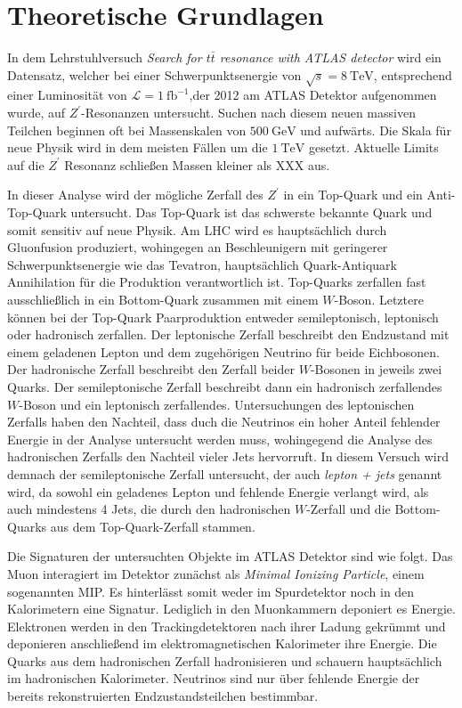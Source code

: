 \section{Theoretische Grundlagen}

In dem Lehrstuhlversuch \textit{Search for $t\bar{t}$ resonance with ATLAS detector} wird ein Datensatz, welcher bei 
einer Schwerpunktsenergie von $\sqrt{s} = \SI{8}{\tera\electronvolt}$, entsprechend einer Luminosität von 
$\mathcal{L} = \SI{1}{\femto\barn}^{-1}$,der 2012 am ATLAS Detektor aufgenommen wurde, auf $Z^\prime$-Resonanzen untersucht. 
Suchen nach diesem neuen massiven Teilchen beginnen oft bei Massenskalen von $\SI{500}{\giga\electronvolt}$ und aufwärts. Die 
Skala für neue Physik wird in dem meisten Fällen um die $\SI{1}{\tera\electronvolt}$ gesetzt. Aktuelle Limits auf die 
$Z^\prime$ Resonanz schließen Massen kleiner als XXX aus. \par 

In dieser Analyse wird der mögliche Zerfall des $Z^\prime$ in ein Top-Quark und ein Anti-Top-Quark untersucht. Das Top-Quark 
ist das schwerste bekannte Quark und somit sensitiv auf neue Physik. Am LHC wird es hauptsächlich durch Gluonfusion 
produziert, wohingegen an Beschleunigern mit geringerer Schwerpunktsenergie wie das Tevatron, hauptsächlich Quark-Antiquark 
Annihilation für die Produktion verantwortlich ist. Top-Quarks 
zerfallen fast ausschließlich in ein Bottom-Quark zusammen mit einem $W$-Boson. Letztere können bei der 
Top-Quark Paarproduktion entweder semileptonisch, 
leptonisch oder hadronisch zerfallen. Der leptonische Zerfall beschreibt den Endzustand mit einem geladenen Lepton und 
dem zugehörigen Neutrino für beide Eichbosonen. Der hadronische Zerfall beschreibt den Zerfall beider $W$-Bosonen in 
jeweils zwei Quarks. Der semileptonische Zerfall beschreibt dann ein hadronisch zerfallendes $W$-Boson und ein leptonisch 
zerfallendes. Untersuchungen des leptonischen Zerfalls haben den Nachteil, dass duch die Neutrinos ein hoher Anteil fehlender 
Energie in der Analyse untersucht werden muss, wohingegend die Analyse des hadronischen Zerfalls den Nachteil vieler Jets 
hervorruft. In diesem Versuch wird demnach der semileptonische Zerfall untersucht, der auch \textit{lepton + jets} genannt wird, 
da sowohl ein geladenes Lepton und fehlende Energie verlangt wird, als auch mindestens 4 Jets, die durch den hadronischen $W$-Zerfall und die Bottom-Quarks 
aus dem Top-Quark-Zerfall stammen. \par 

Die Signaturen der untersuchten Objekte im ATLAS Detektor sind wie folgt. Das Muon interagiert im Detektor zunächst als \textit{Minimal Ionizing Particle}, 
einem sogenannten MIP. Es hinterlässt somit weder im Spurdetektor noch in den Kalorimetern eine Signatur. Lediglich in den Muonkammern deponiert es 
Energie. Elektronen werden in den Trackingdetektoren nach ihrer Ladung gekrümmt und deponieren anschließend im elektromagnetischen Kalorimeter ihre 
Energie. Die Quarks aus dem hadronischen Zerfall hadronisieren und schauern hauptsächlich im hadronischen Kalorimeter. Neutrinos sind nur über fehlende 
Energie der bereits rekonstruierten Endzustandsteilchen bestimmbar.


